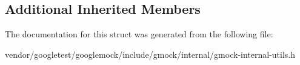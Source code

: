 \subsection*{Additional Inherited Members}


The documentation for this struct was generated from the following file\+:\begin{DoxyCompactItemize}
\item 
vendor/googletest/googlemock/include/gmock/internal/gmock-\/internal-\/utils.\+h\end{DoxyCompactItemize}
